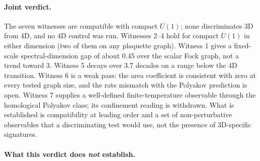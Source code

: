 \documentclass[11pt]{article}
\begin{document}
\paragraph{Joint verdict.} The seven witnesses are compatible with compact
$U(1)$; none discriminates 3D from 4D, and no 4D control was run.
Witnesses 2--4 hold for compact $U(1)$ in either dimension (two of them on
any plaquette graph).  Witness 1 gives a fixed-scale spectral-dimension gap
of about $0.45$ over the scalar Fock graph, not a trend toward 3.  Witness 5
decays over 3.7 decades on a range below the 4D transition.  Witness 6 is a
weak pass: the area coefficient is consistent with zero at every tested
graph size, and the rate mismatch with the Polyakov prediction is open.
Witness 7 supplies a well-defined finite-temperature observable through the
homological Polyakov class; its confinement reading is withdrawn.  What is
established is compatibility at leading order and a set of
non-perturbative observables that a discriminating test would use, not
the presence of 3D-specific signatures.

\paragraph{What this verdict does \emph{not} establish.}
\end{document}
